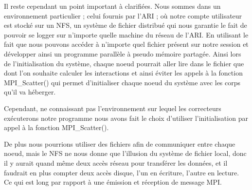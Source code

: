 \par Il reste cependant un point important à clarifiées. Nous sommes dans un environnement particulier ; 
celui fournis par l'ARI ; où notre compte utilisateur est stocké sur un NFS, un système de fichier 
distribué qui nous garantie le fait de pouvoir se logger sur n'importe quelle machine du réseau 
de l'ARI. En utilisant le fait que nous pouvons accéder à n'importe quel fichier présent sur 
notre session et développer ainsi un programme parallèle à pseudo mémoire partagée.
Ainsi lors de l'initialisation du système, chaque noeud  pourrait aller lire dans le fichier 
que dont l'on souhaite calculer les interactions et ainsi éviter les appels à la fonction 
MPI\_Scatter() qui permet d'initialiser chaque noeud du système avec les corps qu'il va héberger.\\

\par Cependant, ne connaissant pas l'environnement sur lequel les correcteurs exécuterons notre 
programme nous avons fait le choix d'utiliser l'initialisation par appel à la fonction MPI\_Scatter().\\

\par De plus nous pourrions utiliser des fichiers afin de communiquer entre chaque noeud, mais le NFS ne nous
donne que l'illusion du système de fichier local, donc il y aurait quand même deux accès réseau pour 
transférer les données, et il faudrait en plus compter deux accès disque, l'un en écriture, l'autre en lecture.
Ce qui est long par rapport à une émission et réception de message MPI.\\
